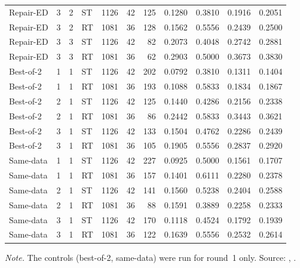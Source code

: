 {\begin{longtable}{@{}lcclrrrrrrr@{}}
Repair-ED & 3 & 2 & ST & 1126 & 42 & 125 & 0.1280 & 0.3810 & 0.1916 & 0.2051\\
Repair-ED & 3 & 2 & RT & 1081 & 36 & 128 & 0.1562 & 0.5556 & 0.2439 & 0.2500\\
Repair-ED & 3 & 3 & ST & 1126 & 42 & 82 & 0.2073 & 0.4048 & 0.2742 & 0.2881\\
Repair-ED & 3 & 3 & RT & 1081 & 36 & 62 & 0.2903 & 0.5000 & 0.3673 & 0.3830\\
\midrule
Best-of-2 & 1 & 1 & ST & 1126 & 42 & 202 & 0.0792 & 0.3810 & 0.1311 & 0.1404\\
Best-of-2 & 1 & 1 & RT & 1081 & 36 & 193 & 0.1088 & 0.5833 & 0.1834 & 0.1867\\
Best-of-2 & 2 & 1 & ST & 1126 & 42 & 125 & 0.1440 & 0.4286 & 0.2156 & 0.2338\\
Best-of-2 & 2 & 1 & RT & 1081 & 36 & 86 & 0.2442 & 0.5833 & 0.3443 & 0.3621\\
Best-of-2 & 3 & 1 & ST & 1126 & 42 & 133 & 0.1504 & 0.4762 & 0.2286 & 0.2439\\
Best-of-2 & 3 & 1 & RT & 1081 & 36 & 105 & 0.1905 & 0.5556 & 0.2837 & 0.2920\\
\midrule
Same-data & 1 & 1 & ST & 1126 & 42 & 227 & 0.0925 & 0.5000 & 0.1561 & 0.1707\\
Same-data & 1 & 1 & RT & 1081 & 36 & 157 & 0.1401 & 0.6111 & 0.2280 & 0.2378\\
Same-data & 2 & 1 & ST & 1126 & 42 & 141 & 0.1560 & 0.5238 & 0.2404 & 0.2588\\
Same-data & 2 & 1 & RT & 1081 & 36 & 88 & 0.1591 & 0.3889 & 0.2258 & 0.2333\\
Same-data & 3 & 1 & ST & 1126 & 42 & 170 & 0.1118 & 0.4524 & 0.1792 & 0.1939\\
Same-data & 3 & 1 & RT & 1081 & 36 & 122 & 0.1639 & 0.5556 & 0.2532 & 0.2614\\
\end{longtable}
}
\vspace{-0.6\baselineskip}
{\footnotesize\color{slate}\textit{Note.} The controls (best-of-2, same-data) were run for round~1 only. Source: , .\par}
\medskip

